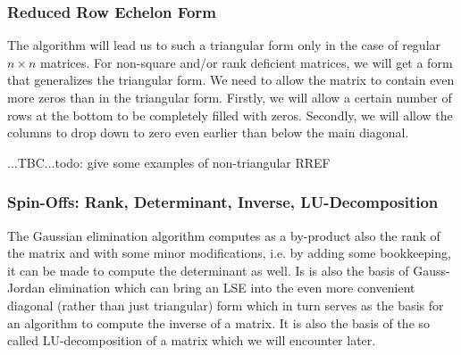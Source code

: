 \subsubsection{Reduced Row Echelon Form}
The algorithm will lead us to such a triangular form only in the case of regular $n \times n$ matrices. For non-square and/or rank deficient matrices, we will get a form that generalizes the triangular form. We need to allow the matrix to contain even more zeros than in the triangular form. Firstly, we will allow a certain number of rows at the bottom to be completely filled with zeros. Secondly, we will allow the columns to drop down to zero even earlier than below the main diagonal.

...TBC...todo: give some examples of non-triangular RREF



\subsubsection{Spin-Offs: Rank, Determinant, Inverse, LU-Decomposition}
The Gaussian elimination algorithm computes as a by-product also the rank of the matrix and with some minor modifications, i.e. by adding some bookkeeping, it can be made to compute the determinant as well. Is is also the basis of Gauss-Jordan elimination which can bring an LSE into the even more convenient diagonal (rather than just triangular) form which in turn serves as the basis for an algorithm to compute the inverse of a matrix. It is also the basis of the so called LU-decomposition of a matrix which we will encounter later.





